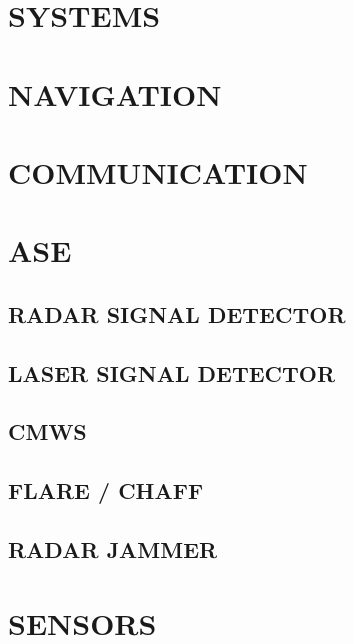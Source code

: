 \documentclass[fontHelvetica]{TechCheck}
\begin{document}
	\cleardoublepage


	\chapter{SYSTEMS}
	\minitoc
	\cleardoublepage

	\chapter{NAVIGATION}
	\minitoc
	\cleardoublepage

	\chapter{COMMUNICATION}
	\minitoc
	\cleardoublepage

	\chapter{ASE}
	\minitoc
	\cleardoublepage

	
	\section{RADAR SIGNAL DETECTOR}

	\clearpage 

	\section{LASER SIGNAL DETECTOR}

	\clearpage 

	\section{CMWS}

	\clearpage 

	\section{FLARE / CHAFF}

	\clearpage 

	\section{RADAR JAMMER}

	\cleardoublepage
	

	\chapter{SENSORS}
	\minitoc
	\cleardoublepage
\end{document}

